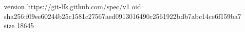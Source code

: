 version https://git-lfs.github.com/spec/v1
oid sha256:f09ee60244b25c1581c27567aed0913016490c2561922bdb7abc14ce6f159ba7
size 18645
